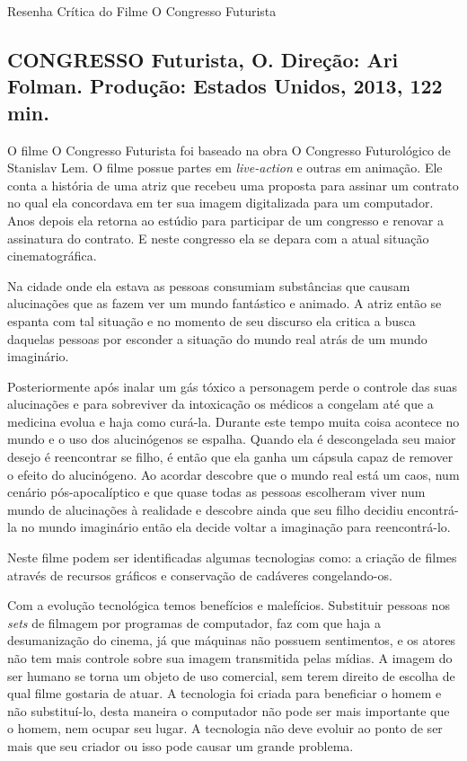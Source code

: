 \documentclass[a4paper,12pt]{article}
\begin{document}
\LARGE
Resenha Crítica do Filme O Congresso Futurista



\large

\subsection*{\textbf{CONGRESSO Futurista, O.} Direção: Ari Folman. Produção: Estados Unidos, 2013, 122 min.}

O filme O Congresso Futurista foi baseado na obra O Congresso Futurológico de Stanislav Lem. O filme possue partes em \textit{live-action} e outras em animação. Ele conta a história de uma atriz que recebeu uma proposta para assinar um contrato no qual ela concordava em ter sua imagem digitalizada para um computador. Anos depois ela retorna ao estúdio para participar de um congresso e renovar a assinatura do contrato. E neste congresso ela se depara com a atual situação cinematográfica.

Na cidade onde ela estava as pessoas consumiam substâncias que causam alucinações que as fazem ver um mundo fantástico e animado. A atriz então se espanta com tal situação e no momento de seu discurso ela critica a busca daquelas pessoas por esconder a situação do mundo real atrás de um mundo imaginário. 

Posteriormente após inalar um gás tóxico a personagem perde o controle das suas alucinações e para sobreviver da intoxicação os médicos a congelam até que a medicina evolua e haja como curá-la.
Durante este tempo muita coisa acontece no mundo e o uso dos alucinógenos se espalha. Quando ela é descongelada seu maior desejo é reencontrar se filho, é então que ela ganha um cápsula capaz de remover o efeito do alucinógeno. Ao acordar descobre que o mundo real está um caos, num cenário pós-apocalíptico e que quase todas as pessoas escolheram viver num mundo de alucinações à realidade e descobre ainda que seu filho decidiu encontrá-la no mundo imaginário então ela decide voltar a imaginação para reencontrá-lo.

Neste filme podem ser identificadas algumas tecnologias como: a criação de filmes através de recursos gráficos e conservação de cadáveres congelando-os. 

Com a evolução tecnológica temos benefícios e malefícios. Substituir pessoas nos \textit{sets} de filmagem por programas de computador, faz com que haja a desumanização do cinema, já que máquinas não possuem sentimentos, e os atores não tem mais controle sobre sua imagem transmitida pelas mídias. A imagem do ser humano se torna um objeto de uso comercial, sem terem direito de escolha de qual filme gostaria de atuar. A tecnologia foi criada para beneficiar o homem e não substituí-lo, desta maneira o computador não pode ser mais importante que o homem, nem ocupar seu lugar. A tecnologia não deve evoluir ao ponto de ser mais que seu criador ou isso pode causar um grande problema.
\end{document}
